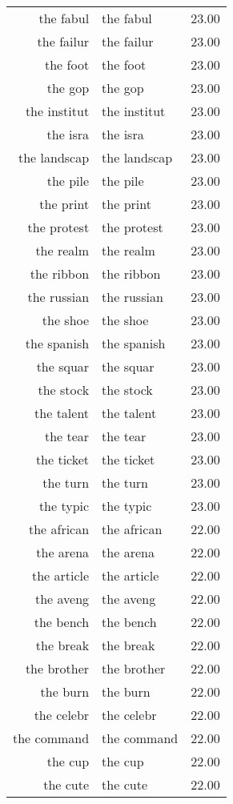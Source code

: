 \begin{table}[ht]
\begin{tabular}{rlr}
  the fabul & the fabul & 23.00 \\ 
  the failur & the failur & 23.00 \\ 
  the foot & the foot & 23.00 \\ 
  the gop & the gop & 23.00 \\ 
  the institut & the institut & 23.00 \\ 
  the isra & the isra & 23.00 \\ 
  the landscap & the landscap & 23.00 \\ 
  the pile & the pile & 23.00 \\ 
  the print & the print & 23.00 \\ 
  the protest & the protest & 23.00 \\ 
  the realm & the realm & 23.00 \\ 
  the ribbon & the ribbon & 23.00 \\ 
  the russian & the russian & 23.00 \\ 
  the shoe & the shoe & 23.00 \\ 
  the spanish & the spanish & 23.00 \\ 
  the squar & the squar & 23.00 \\ 
  the stock & the stock & 23.00 \\ 
  the talent & the talent & 23.00 \\ 
  the tear & the tear & 23.00 \\ 
  the ticket & the ticket & 23.00 \\ 
  the turn & the turn & 23.00 \\ 
  the typic & the typic & 23.00 \\ 
  the african & the african & 22.00 \\ 
  the arena & the arena & 22.00 \\ 
  the article & the article & 22.00 \\ 
  the aveng & the aveng & 22.00 \\ 
  the bench & the bench & 22.00 \\ 
  the break & the break & 22.00 \\ 
  the brother & the brother & 22.00 \\ 
  the burn & the burn & 22.00 \\ 
  the celebr & the celebr & 22.00 \\ 
  the command & the command & 22.00 \\ 
  the cup & the cup & 22.00 \\ 
  the cute & the cute & 22.00 \\ 

\end{tabular}
\end{table}

